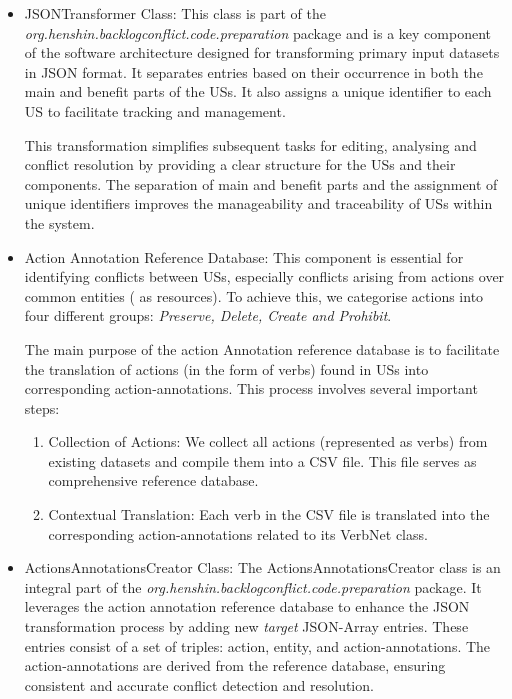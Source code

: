 \begin{itemize}
	\item JSONTransformer Class: This class is part of the \textit{org.henshin.backlogconflict.code.preparation} package and is a key component of the software architecture designed for transforming primary input datasets in JSON format. It separates entries based on their occurrence in both the main and benefit parts of the USs. It also assigns a unique identifier to each US to facilitate tracking and management. 
	
	This transformation simplifies subsequent tasks for editing, analysing and conflict resolution by providing a clear structure for the USs and their components. The separation of main and benefit parts and the assignment of unique identifiers improves the manageability and traceability of USs within the system.
	
	\item Action Annotation Reference Database: This component is essential for identifying conflicts between USs, especially conflicts arising from actions over common entities ( as resources). To achieve this, we categorise actions into four different groups: \textit{Preserve, Delete, Create and Prohibit}.
	
	The main purpose of the action Annotation reference database is to facilitate the translation of actions (in the form of verbs) found in USs into corresponding action-annotations. This process involves several important steps:
	\begin{enumerate}
		\item Collection of Actions: We collect all actions (represented as verbs) from existing datasets and compile them into a CSV file. This file serves as comprehensive reference database.
		
		\item Contextual Translation: Each verb in the CSV file is translated into the corresponding action-annotations related to its VerbNet class. 
	\end{enumerate}
	
	\item ActionsAnnotationsCreator Class: The ActionsAnnotationsCreator class is an integral part of the \textit{org.henshin.backlogconflict.code.preparation} package. It leverages the action annotation reference database to enhance the JSON transformation process by adding new \textit{target} JSON-Array entries. These entries consist of a set of triples: action, entity, and action-annotations. The action-annotations are derived from the reference database, ensuring consistent and accurate conflict detection and resolution.
	

\end{itemize}
